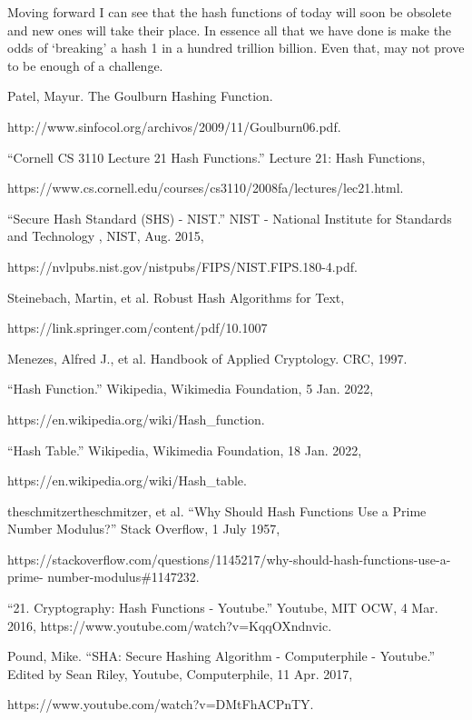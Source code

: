 \documentclass[11pt, oneside]{article}   	%
\begin{document}
Moving forward I can see that the hash functions of today will soon be obsolete and new ones will take their place. In essence all that we have done is make the odds of ‘breaking’ a hash 1 in a hundred trillion billion. Even that, may not prove to be enough of a challenge.
\begin{thebibliography}{99}

Patel, Mayur. The Goulburn Hashing Function.

http://www.sinfocol.org/archivos/2009/11/Goulburn06.pdf.

“Cornell CS 3110 Lecture 21 Hash Functions.” Lecture 21: Hash Functions,

https://www.cs.cornell.edu/courses/cs3110/2008fa/lectures/lec21.html.

\bibitem{}
“Secure Hash Standard (SHS) - NIST.” NIST - National Institute for Standards and Technology , NIST, Aug. 2015,

https://nvlpubs.nist.gov/nistpubs/FIPS/NIST.FIPS.180-4.pdf.

\bibitem{}
Steinebach, Martin, et al. Robust Hash Algorithms for Text,

https://link.springer.com/content/pdf/10.1007%

\bibitem{}
Menezes, Alfred J., et al. Handbook of Applied Cryptology. CRC, 1997.

\bibitem{}
“Hash Function.” Wikipedia, Wikimedia Foundation, 5 Jan. 2022,


https://en.wikipedia.org/wiki/Hash\_function.

\bibitem{}
“Hash Table.” Wikipedia, Wikimedia Foundation, 18 Jan. 2022,


https://en.wikipedia.org/wiki/Hash\_table.

\bibitem{}
theschmitzertheschmitzer, et al. “Why Should Hash Functions Use a Prime Number
Modulus?” Stack Overflow, 1 July 1957,

https://stackoverflow.com/questions/1145217/why-should-hash-functions-use-a-prime- number-modulus\#1147232.

\bibitem{}
“21. Cryptography: Hash Functions - Youtube.” Youtube, MIT OCW, 4 Mar. 2016, https://www.youtube.com/watch?v=KqqOXndnvic.

\bibitem{}
Pound, Mike. “SHA: Secure Hashing Algorithm - Computerphile - Youtube.” 
Edited by Sean Riley, Youtube, Computerphile, 11 Apr. 2017,

https://www.youtube.com/watch?v=DMtFhACPnTY.


\end{thebibliography}
\end{document}
